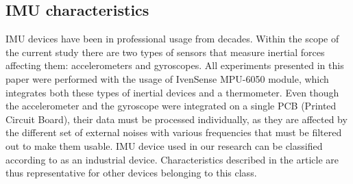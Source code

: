 \documentclass[sensors,article,submit,moreauthors,pdftex,10pt,a4paper]{mdpi}
\begin{document}
\subsection{IMU characteristics}
IMU devices have been in professional usage from decades. Within the scope of the current study there are two types of sensors that measure inertial forces affecting them: accelerometers and gyroscopes. All experiments presented in this paper were performed with the usage of IvenSense MPU-6050 module, which integrates both these types of inertial devices and a thermometer. Even though the accelerometer and the gyroscope were integrated on a single PCB (Printed Circuit Board), their data must be processed individually, as they are affected by the different set of external noises with various frequencies that must be filtered out to make them usable. IMU device used in our research can be classified according to \cite{Alexiev2013} as an industrial device. Characteristics described in the article are thus representative for other devices belonging to this class.
\end{document}
